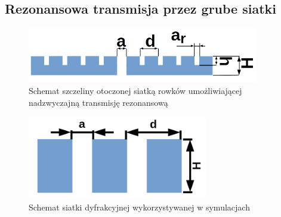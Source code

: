 \subsection{Rezonansowa transmisja przez grube siatki}
\label{subart:rezo-grating}

\begin{figure}[tb]
	\centering
	\includegraphics[width=0.9\textwidth]{images/thz/schemat-1szczelina.png}
	\caption{Schemat szczeliny otoczonej siatką rowków umożliwiającej nadzwyczajną transmisję rezonansową}
	\label{fig:szczelina-schem}
\end{figure}

\begin{figure}
	\includegraphics[width=0.7\textwidth]{images/thz/schemat-siatka.png}
	\caption{Schemat siatki dyfrakcyjnej wykorzystywanej w symulacjach}
	\label{fig:rezo-siat-H}
\end{figure}

